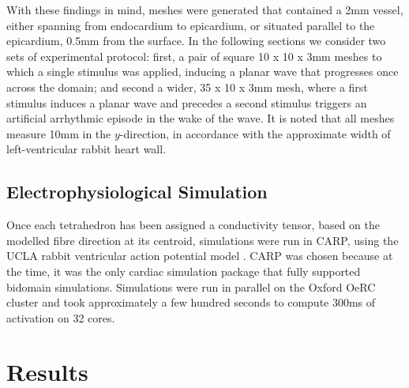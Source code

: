   With these findings in mind, meshes were generated that contained a 2mm vessel, either spanning from endocardium to epicardium, or situated parallel to the epicardium, 0.5mm from the surface. In the following sections we consider two sets of experimental protocol: first, a pair of square 10 x 10 x 3mm meshes to which a single stimulus was applied, inducing a planar wave that progresses once across the domain; and second a wider, 35 x 10 x 3mm mesh, where a first stimulus induces a planar wave and precedes a second stimulus triggers an artificial arrhythmic episode in the wake of the wave. It is noted that all meshes measure 10mm in the $y$-direction, in accordance with the approximate width of left-ventricular rabbit heart wall.

\subsection{Electrophysiological Simulation} %
\label{sec:electrophysiological_simulation}  
  Once each tetrahedron has been assigned a conductivity tensor, based on the modelled fibre direction at its centroid, simulations were run in CARP, using the UCLA rabbit ventricular action potential model \cite{Mahajan2008}. CARP was chosen because at the time, it was the only cardiac simulation package that fully supported bidomain simulations. Simulations were run in parallel on the Oxford OeRC cluster and took approximately a few hundred seconds to compute 300ms of activation on 32 cores.
  

\section{Results} %
\label{sec:results}
